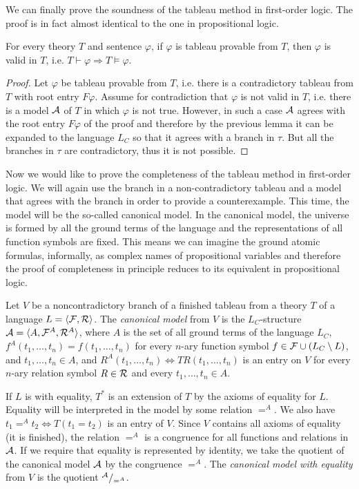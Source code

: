 We can finally prove the soundness of the tableau method in first-order logic. The proof is in fact almost identical to the one in propositional logic. 

\begin{theorem}
For every theory $T$ and sentence $\varphi$, if $\varphi$ is tableau provable from $T$, then $\varphi$ is valid in $T$, i.e. $T \vdash \varphi \Rightarrow T \vDash \varphi$. 
\end{theorem}
\begin{proof}
Let $\varphi$ be tableau provable from $T$, i.e. there is a contradictory tableau from $T$ with root entry $F \varphi$. Assume for contradiction that $\varphi$ is not valid in $T$, i.e. there is a model $\mathcal{A}$ of $T$ in which $\varphi$ is not true. However, in such a case $\mathcal{A}$ agrees with the root entry $F \varphi$ of the proof and therefore by the previous lemma it can be expanded to the language $L_C$ so that it agrees with a branch in $\tau$. But all the branches in $\tau$ are contradictory, thus it is not possible.
\end{proof}

Now we would like to prove the completeness of the tableau method in first-order logic. We will again use the branch in a non-contradictory tableau and a model that agrees with the branch in order to provide a counterexample. This time, the model will be the so-called canonical model. In the canonical model, the universe is formed by all the ground terms of the language and the representations of all function symbols are fixed. This means we can imagine the ground atomic formulas, informally, as complex names of propositional variables and therefore the proof of completeness in principle reduces to its equivalent in propositional logic.

Let $V$ be a noncontradictory branch of a finished tableau from a theory $T$ of a language $L = \langle \mathcal{F}, \mathcal{R} \rangle$. The \emph{canonical model} from $V$ is the $L_C$-structure $\mathcal{A} = \langle A, \mathcal{F}^A, \mathcal{R}^A \rangle$, where $A$ is the set of all ground terms of the language $L_C$, $f^A(t_1, \dots, t_n) = f(t_1, \dots, t_n)$ for every $n$-ary function symbol $f \in \mathcal{F} \cup (L_C \setminus L)$, and $t_1, \dots, t_n \in A$, and $R^A(t_1, \dots, t_n) \Leftrightarrow TR(t_1, \dots, t_n)$ is an entry on $V$ for every $n$-ary relation symbol $R \in \mathcal{R}$ and every $t_1, \dots, t_n \in A$.

If $L$ is with equality, $T^*$ is an extension of $T$ by the axioms of equality for $L$. Equality will be interpreted in the model by some relation $=^A$. We also have $t_1 =^A t_2 \Leftrightarrow T(t_1 = t_2)$ is an entry of $V$. Since $V$ contains all axioms of equality (it is finished), the relation $=^A$ is a congruence for all functions and relations in $\mathcal{A}$. If we require that equality is represented by identity, we take the quotient of the canonical model $\mathcal{A}$ by the congruence $=^A$. The \emph{canonical model with equality} from $V$ is the quotient $^{\mathcal{A}}/_{=^A}$. 

